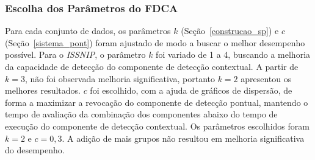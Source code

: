 \documentclass[cic,tc]{iiufrgs}
\begin{document}
\subsubsection{Escolha dos Parâmetros do FDCA}
\label{issnip_fdca}
Para cada conjunto de dados, os parâmetros $k$ (Seção~\ref{construcao_sp}) e $c$ (Seção~\ref{sistema_pont}) foram ajustado de modo a buscar o melhor desempenho possível. Para o \textit{ISSNIP}, o parâmetro $k$ foi variado de 1 a 4, buscando a melhoria da capacidade de detecção do componente de detecção contextual. A partir de $k= 3$, não foi observada melhoria significativa, portanto $k = 2$ apresentou os melhores resultados. $c$ foi escolhido, com a ajuda de gráficos de dispersão, de forma a maximizar a revocação do componente de detecção pontual, mantendo o tempo de avaliação da combinação dos componentes abaixo do tempo de execução do componente de detecção contextual. Os parâmetros escolhidos foram $k = 2$ e $c = 0,3$. A adição de mais grupos não resultou em melhoria significativa do desempenho.

\bigskip
\begin{table}[h]
\begin{adjustwidth}{-.5in}{-.5in}
    \caption{Avaliação do FDCA para o conjunto de dados \textit{ISSNIP}}
    \bigskip
    \begin{center}
    \label{av_issnip}
    \end{center}
\end{adjustwidth}
\end{table}
\end{document}
